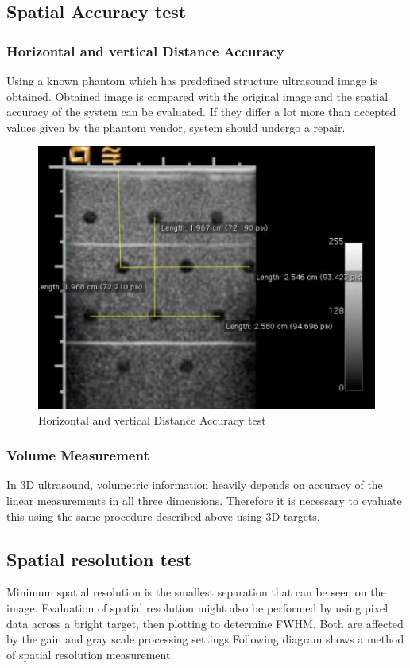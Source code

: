 \documentclass[12pt]{article}
\begin{document}
\subsection{Spatial Accuracy test}
\subsubsection{Horizontal and vertical Distance Accuracy}
Using a known phantom which has predefined structure ultrasound image is obtained. Obtained image is compared with the original image and the spatial accuracy of the system can be evaluated. If they differ a lot more than accepted values given by the phantom vendor, system should undergo a repair.
\begin{figure}[!h]
    \centering
    \includegraphics[width=0.6\linewidth]{hv.jpg}
    \caption{\small{Horizontal and vertical Distance Accuracy test}}
    \label{fig:Horizontal and vertical Distance Accuracy}
\end{figure}
\subsubsection{Volume Measurement}
In 3D ultrasound, volumetric information heavily depends on accuracy of the linear measurements in all three dimensions. Therefore it is necessary to evaluate this using the same procedure described above using 3D targets. 


\subsection{Spatial resolution test}
Minimum spatial resolution is the smallest separation that can be seen on the image. Evaluation of spatial resolution might also be performed by using pixel data across a bright target, then plotting to determine FWHM. Both are affected by the gain and gray scale processing settings
Following diagram shows a method of spatial resolution measurement. 
\end{document}
